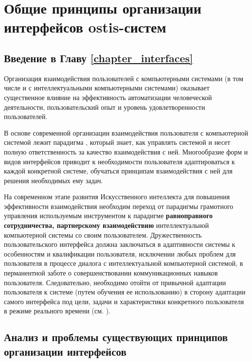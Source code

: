 \chapter{Общие принципы организации интерфейсов ostis-систем}
\label{chapter_interfaces}

\vspace{-7\baselineskip}

\section*{Введение в Главу \ref{chapter_interfaces}}

Организация взаимодействия пользователей с компьютерными системами (в том числе и с интеллектуальными компьютерными системами) оказывает существенное влияние на эффективность автоматизации человеческой деятельности, пользовательский опыт и уровень удовлетворенности пользователей. 

В основе современной организации взаимодействия пользователя с компьютерной системой лежит парадигма , который знает, как управлять системой и несет полную ответственность за качество взаимодействия с ней. Многообразие форм и видов интерфейсов приводит к необходимости пользователя адаптироваться к каждой конкретной системе, обучаться принципам взаимодействия с ней для решения необходимых ему задач.

На современном этапе развития Искусственного интеллекта для повышения эффективности взаимодействия необходим переход от парадигмы грамотного управления используемым инструментом к парадигме \textbf{равноправного сотрудничества, партнерскому взаимодействию} интеллектуальной компьютерной системы со своим пользователем. Дружественность пользовательского интерфейса должна заключаться в адаптивности системы к особенностям и квалификации пользователя, исключении любых проблем для пользователя в процессе диалога с интеллектуальной компьютерной системой, в перманентной заботе о совершенствовании коммуникационных навыков пользователя. Следовательно, необходимо отойти от привычной адаптации пользователя к системе (путем обучения ее использованию) в сторону адаптации самого интерфейса под цели, задачи и характеристики конкретного пользователя в режиме реального времени (см. ).

\section{Анализ и проблемы существующих принципов организации интерфейсов}
\label{sec_analysis}

